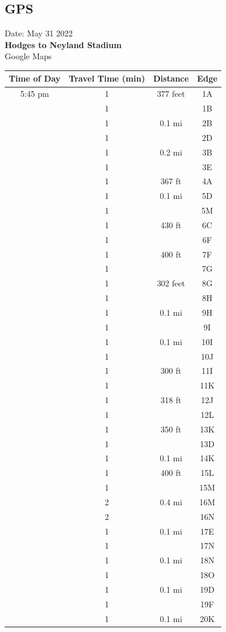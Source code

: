 \documentclass{article}
\begin{document}
\newpage
\subsection{GPS}
\large Date: May 31 2022 \\ 
\textbf{Hodges to Neyland Stadium} \\
\normalsize \hspace{0.5in} Google Maps
\begin{center}
\begin{tabular}{|c|c|c|c|}
\hline
Time of Day & Travel Time (min) & Distance & Edge\\
\hline\hline
5:45 pm & 1 & 377 feet & 1A \\
\hline
 & 1 & & 1B \\
\hline
& 1 & 0.1 mi & 2B \\
\hline
& 1 & & 2D \\ \hline
& 1 & 0.2 mi & 3B \\ \hline
& 1 & & 3E \\ \hline
& 1 & 367 ft & 4A \\ \hline
& 1 & 0.1 mi & 5D \\ \hline
& 1 & & 5M \\ \hline
& 1 & 430 ft & 6C \\ \hline
& 1 & & 6F \\ \hline
& 1 & 400 ft & 7F \\ \hline
& 1 & & 7G \\ \hline
& 1 & 302 feet & 8G \\ \hline
& 1 & & 8H \\ \hline
& 1 & 0.1 mi & 9H \\ \hline
& 1 & & 9I \\ \hline
& 1 & 0.1 mi & 10I \\ \hline
& 1 & & 10J \\ \hline
& 1 & 300 ft & 11I \\ \hline
& 1 & & 11K \\ \hline
& 1 & 318 ft & 12J \\ \hline
& 1 & & 12L \\ \hline
& 1 & 350 ft & 13K \\ \hline
& 1 & & 13D \\ \hline
& 1 & 0.1 mi & 14K \\ \hline
& 1 & 400 ft & 15L \\ \hline
& 1 & & 15M \\ \hline
& 2 & 0.4 mi & 16M \\ \hline
& 2 & & 16N \\ \hline
& 1 & 0.1 mi& 17E \\ \hline
& 1 & & 17N \\ \hline
& 1 & 0.1 mi& 18N \\ \hline
& 1 & & 18O \\ \hline
& 1 & 0.1 mi & 19D \\ \hline
& 1 & & 19F \\\hline
& 1 & 0.1 mi & 20K \\ \hline
\end{tabular}\end{center}
\vspace{0.5in}
\end{document}
